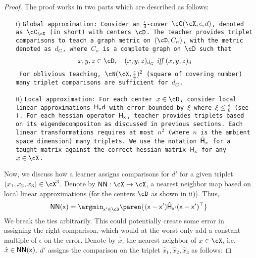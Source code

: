 \begin{proof}
    The proof works in two parts which are described as follows:
    \begin{enumerate}
        \item[i)] \tt{Global approximation:} Consider an $\frac{\epsilon}{4}$-cover $\cC(\cX,\epsilon,d)$, denoted as $\cC_{\cX}$ (in short) with centers $\cD$. The teacher provides triplet comparisons to teach a graph metric on $(\cD, C_{n})$, with the metric denoted as $d_G$, where $C_{n}$ is a complete graph on $\cD$ such that
        \begin{align*}
            x,y,z \in \cD,\quad (x,y,z)_{d_G} \textit{ iff } (x,y,z)_{d}
        \end{align*}
        For oblivious teaching,  $\cN(\cX,\frac{\epsilon}{4})^2$ (square of covering number) many triplet comparisons are sufficient for $d_G$.
        \item[ii)] \tt{Local approximation:} For each center $x \in \cD$, consider local linear approximations $\sf{H}_x d$ with error bounded by $\xi$ where $\xi \le \frac{\epsilon}{6}$ (see ). For each hessian operator $\sf{H}_x$, teacher provides triplets based on its eigendecompositon as discussed in previous sections. Each linear transformations requires at most $n^2$ (where $n$ is the ambient space dimension) many triplets. We use the notation $\hat{\sf{H}}_x$ for a taught matrix against the correct hessian matrix $\sf{H}_x$ for any $x \in \cX$. 
    \end{enumerate}
    Now, we discuss how a learner assigns comparisons for $d'$ for a given triplet $(x_1,x_2,x_3) \in \cX^3$. Denote by $\sf{NN}: \cX \to \cX$, a nearest neighbor map based on local linear approximations (for the centers $\cD$ as shown in ii)). Thus, 
    \begin{align*}
        \sf{NN}(x) = \argmin_{x' \in \cD} \paren{(x-x')\hat{\sf{H}}_{x'}(x-x')^{\top}}
    \end{align*}
    We break the ties arbitrarily. This could potentially create some error in assigning the right comparison, which would at the worst only add a constant multiple of $\epsilon$ on the error. Denote by $\hat{x}$, the nearest neighbor of $x \in \cX$, i.e.  $\hat{x} \in \sf{NN}(x)$.
    $d'$ assigns the comparison on the triplet $\hat{x}_1, \hat{x}_2,\hat{x}_3$ as follows:

\end{proof}
